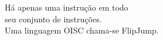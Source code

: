 \documentclass[preview]{standalone}
\begin{document}
Há apenas uma instrução em todo\\ seu conjunto de instruções.\\Uma linguagem OISC chama-se FlipJump.\\
\end{document}
